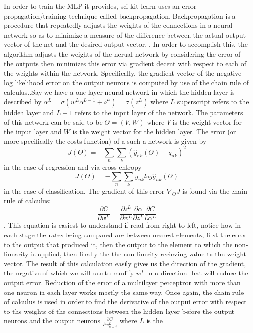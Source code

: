 In order to train the MLP it provides, sci-kit learn uses an error
propagation/training technique called backpropagation. Backpropagation
is a procedure that repeatedly adjusts the weights of the connections
in a neural network so as to minimize a measure of the difference
between the actual output vector of the net and the desired output
vector. \cite{Rumelhart}. In order to accomplish this, the algorithm
adjusts the weights of the nerual network by considering the error of
the outputs then minimizes this error via gradient decent with respect
to each of the weights within the network. Specifically, the gradient
vector of the negative log likelihood error on the output neurons is
computed by use of the chain rule of calculus.\cite{Murphy}.Say we
have a one layer neural network in which the hidden layer is described
by $\alpha^{L} = \sigma(w^{L}\alpha^{L-1} + b^{L}) = \sigma(z^{L})$
where $L$ superscript refers to the hidden layer and $L-1$ refers
to the input layer of the network. The parameters of this network can
be said to be $\Theta = (V,W)$ where $V$ is the weight vector for the input
layer and $W$ is the weight vector for the hidden layer. The error (or
more specifically the costs function) of a such a network is given by $$J(\Theta ) =
- \sum_n\sum_k(\hat{y}_{nk}(\Theta)-y_{nk})^2$$ in the case of
regression and via cross entropy $$J(\Theta ) =
- \sum_n\sum_ky_{nk}log\hat{y}_{nk}(\Theta)$$ in the case of
classification. The gradient of this error $\nabla_{\Theta}J$ is
found via the chain rule of calculus: $$\frac{\partial C}{\partial
w^{L}} = \frac{\partial z^{L}}{\partial
w^{L}}\frac{\partial \alpha}{\partial z^{L}}\frac{\partial
C}{\partial \alpha^{L}}$$. This equation is easiest to understand if
read from right to left, notice how in each stage the rates being
compared are between nearest elements, first the error to the output
that produced it, then the output to the element to which the
non-linearity is applied, then finally the the non-linerity recieving
value to the weight vector. The result of this calculation easily
gives us the direction of the gradient, the negative of which we will
use to modify $w^{L}$ in a direction that will reduce the output
error. Reduction of the error of a multilayer perceptron with more
than one neuron in each layer works mostly the same way. Once again,
the chain rule of calculus is used in order to find the derivative of
the output error with respect to the weights of the connections
between the hidden layer before the output neurons and the output
neurons $\frac{\partial C}{\partial w^{L}_{n-j}}$ where $L$ is the
